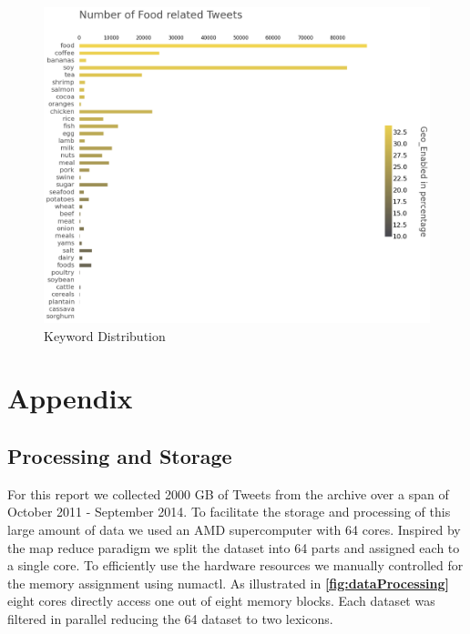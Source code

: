 \documentclass[12pt]{report}
\begin{document}
  \begin{figure}[H]
\centerline{ \noindent\includegraphics[width=1\textwidth]{img/anal/n_food_tweets}}
 \caption{Keyword Distribution}
 \label{fig:keywordDistribution}
\end{figure}
 


%
%

\cleardoublepage
{}
{}






\cleardoublepage
{}
\chapter*{Appendix}

\section{Processing and Storage}

For this report we collected 2000 GB of Tweets from the archive over a span of  October 2011 - September 2014. To facilitate the storage and processing of this large amount of data we used an AMD supercomputer with 64 cores. Inspired by the  map reduce paradigm we split the dataset into 64 parts and assigned each to a single core. To efficiently use the hardware resources we manually controlled for the memory assignment using numactl. As illustrated in\textbf{ \ref{fig:dataProcessing}} eight cores directly access one out of eight memory blocks. Each dataset was filtered in parallel reducing the 64 dataset to two lexicons. 
\end{document}
